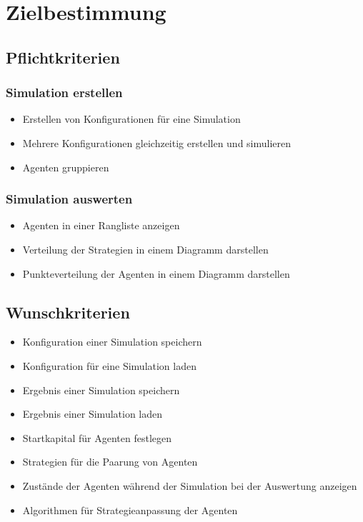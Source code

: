 \section{Zielbestimmung}

\subsection{Pflichtkriterien}

\subsubsection{Simulation erstellen}

\begin{itemize}
\item Erstellen von Konfigurationen für eine Simulation
\item Mehrere Konfigurationen gleichzeitig erstellen und simulieren
\item Agenten gruppieren
\end{itemize}

\subsubsection{Simulation auswerten}
\begin{itemize}
\item Agenten in einer Rangliste anzeigen
\item Verteilung der Strategien in einem Diagramm darstellen
\item Punkteverteilung der Agenten in einem Diagramm darstellen
\end{itemize}

\subsection{Wunschkriterien}
\begin{itemize}
\item Konfiguration einer Simulation speichern
\item Konfiguration für eine Simulation laden
\item Ergebnis einer Simulation speichern
\item Ergebnis einer Simulation laden
\item Startkapital für Agenten festlegen
\item Strategien für die Paarung von Agenten
\item Zustände der Agenten während der Simulation bei der Auswertung anzeigen
\item Algorithmen für Strategieanpassung der Agenten
\end{itemize}

